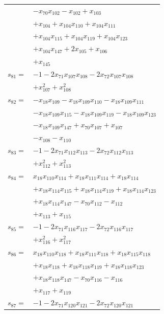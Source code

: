 \begin{longtable}{@{}r@{\;}l@{}}
 & \(\displaystyle -x_{70}x_{102} -x_{102} +x_{103}\) \\
 & \(\displaystyle +x_{104} +x_{104}x_{110} +x_{104}x_{111}\) \\
 & \(\displaystyle +x_{104}x_{115} +x_{104}x_{119} +x_{104}x_{123}\) \\
 & \(\displaystyle +x_{104}x_{147} +2x_{105} +x_{106}\) \\
 & \(\displaystyle +x_{145}\) \\[3pt]
\(s_{81}=\) & \(\displaystyle -1 -2x_{71}x_{107}x_{108} -2x_{72}x_{107}x_{108}\) \\
 & \(\displaystyle +x_{107}^{2} +x_{108}^{2}\) \\[3pt]
\(s_{82}=\) & \(\displaystyle -x_{18}x_{109} -x_{18}x_{109}x_{110} -x_{18}x_{109}x_{111}\) \\
 & \(\displaystyle -x_{18}x_{109}x_{115} -x_{18}x_{109}x_{119} -x_{18}x_{109}x_{123}\) \\
 & \(\displaystyle -x_{18}x_{109}x_{147} +x_{70}x_{107} +x_{107}\) \\
 & \(\displaystyle -x_{108} -x_{110}\) \\[3pt]
\(s_{83}=\) & \(\displaystyle -1 -2x_{71}x_{112}x_{113} -2x_{72}x_{112}x_{113}\) \\
 & \(\displaystyle +x_{112}^{2} +x_{113}^{2}\) \\[3pt]
\(s_{84}=\) & \(\displaystyle x_{18}x_{110}x_{114} +x_{18}x_{111}x_{114} +x_{18}x_{114}\) \\
 & \(\displaystyle +x_{18}x_{114}x_{115} +x_{18}x_{114}x_{119} +x_{18}x_{114}x_{123}\) \\
 & \(\displaystyle +x_{18}x_{114}x_{147} -x_{70}x_{112} -x_{112}\) \\
 & \(\displaystyle +x_{113} +x_{115}\) \\[3pt]
\(s_{85}=\) & \(\displaystyle -1 -2x_{71}x_{116}x_{117} -2x_{72}x_{116}x_{117}\) \\
 & \(\displaystyle +x_{116}^{2} +x_{117}^{2}\) \\[3pt]
\(s_{86}=\) & \(\displaystyle x_{18}x_{110}x_{118} +x_{18}x_{111}x_{118} +x_{18}x_{115}x_{118}\) \\
 & \(\displaystyle +x_{18}x_{118} +x_{18}x_{118}x_{119} +x_{18}x_{118}x_{123}\) \\
 & \(\displaystyle +x_{18}x_{118}x_{147} -x_{70}x_{116} -x_{116}\) \\
 & \(\displaystyle +x_{117} +x_{119}\) \\[3pt]
\(s_{87}=\) & \(\displaystyle -1 -2x_{71}x_{120}x_{121} -2x_{72}x_{120}x_{121}\) \\

\end{longtable}
